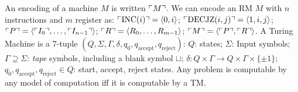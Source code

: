  An encoding of a machine $M$ is written $\ulcorner M \urcorner$.
 We can encode an RM $M$ with $n$ instructions and $m$ register as: $\ulcorner \operatorname{INC}(i) \urcorner = \langle 0, i \rangle$;
$\ulcorner \operatorname{DECJZ}(i,j) \urcorner = \langle 1, i, j \rangle$;
$\ulcorner P \urcorner = \langle \ulcorner I_0 \urcorner, \ldots, \ulcorner I_{n-1} \urcorner \rangle$;
$\ulcorner R \urcorner = \langle R_0, \ldots, R_{m-1} \rangle$;
$\ulcorner M \urcorner = \langle \ulcorner P \urcorner, \ulcorner R \urcorner \rangle$.
 A Turing Machine is a 7-tuple $(Q, \Sigma, \Gamma, \delta, q_0, q_{\text{accept}}, q_{\text{reject}})$: $Q$: states; $\Sigma$: Input symbols; $\Gamma \supseteq \Sigma$: \textit{tape} symbols, including a blank symbol $\sqcup$; $\delta: Q \times \Gamma \to Q \times \Gamma \times \{\pm 1\}$; $q_0, q_{\text{accept}}, q_{\text{reject}} \in Q$: start, accept, reject states.
 Any problem is computable by any model of computation iff it is computable by a TM.
